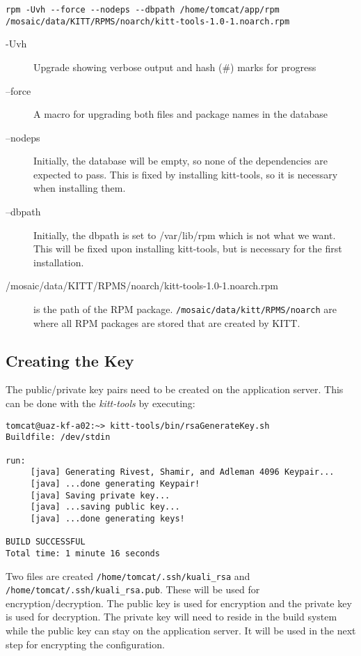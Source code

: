 \documentclass[12pt,notitlepage]{article}
\begin{document}
\begin{lstlisting}
rpm -Uvh --force --nodeps --dbpath /home/tomcat/app/rpm /mosaic/data/KITT/RPMS/noarch/kitt-tools-1.0-1.noarch.rpm 
\end{lstlisting}

\begin{description}
  \item[-Uvh] Upgrade showing verbose output and hash (\#) marks for progress
  \item[--force] A macro for upgrading both files and package names in the database
  \item[--nodeps] Initially, the database will be empty, so none of the dependencies are expected to pass. This
    is fixed by installing kitt-tools, so it is necessary when installing them.
  \item[--dbpath] Initially, the dbpath is set to /var/lib/rpm which is not what we want. This will be
    fixed upon installing kitt-tools, but is necessary for the first installation.
  \item[/mosaic/data/KITT/RPMS/noarch/kitt-tools-1.0-1.noarch.rpm] is the path of the RPM package. 
    \verb|/mosaic/data/kitt/RPMS/noarch| are where all RPM packages are stored that are created by
    KITT.
\end{description}

\subsection{Creating the Key}
The public/private key pairs need to be created on the application server. This can be done with the \emph{kitt-tools}
by executing:

\begin{lstlisting}
tomcat@uaz-kf-a02:~> kitt-tools/bin/rsaGenerateKey.sh 
Buildfile: /dev/stdin

run:
     [java] Generating Rivest, Shamir, and Adleman 4096 Keypair...
     [java] ...done generating Keypair!
     [java] Saving private key...
     [java] ...saving public key...
     [java] ...done generating keys!

BUILD SUCCESSFUL
Total time: 1 minute 16 seconds
\end{lstlisting}

Two files are created \verb|/home/tomcat/.ssh/kuali_rsa| and \verb|/home/tomcat/.ssh/kuali_rsa.pub|. These
will be used for encryption/decryption. The public key is used for encryption and the private key
is used for decryption. The private key will need to reside in the build system while the public key
can stay on the application server. It will be used in the next step for encrypting the configuration.
\end{document}
